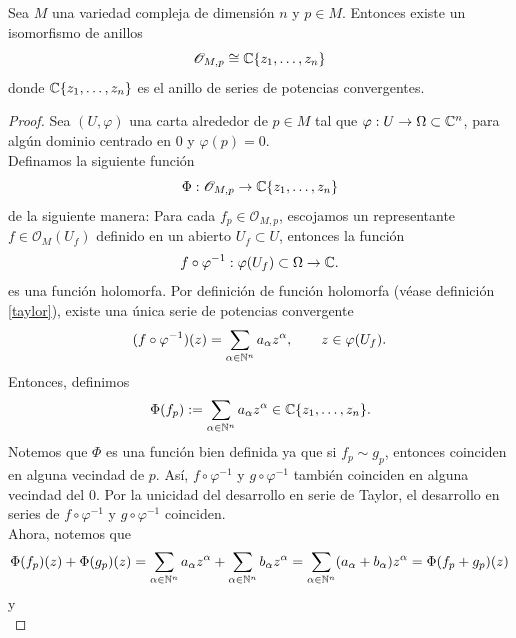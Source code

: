 \fi
\begin{propo}
	Sea $M$ una variedad compleja de dimensión $n$ y $p\in M$. Entonces existe un isomorfismo de anillos
	\begin{equation*}
		\mathscr{O}_{M,p}\cong \mathbb{C}\{z_1,\dots,z_n\}
	\end{equation*}
	donde $\mathbb{C}\{z_1,\dots,z_n\}$ es el anillo de series de potencias convergentes. 
\end{propo}

\begin{proof}
	Sea $(U,\varphi)$ una carta alrededor de $p\in M$ tal que $\varphi:U\to \Omega\subset \mathbb{C}^n$, para algún dominio centrado en $0$ y $\varphi(p)=0$.\\
	Definamos la siguiente función
	\begin{equation*}
		\Phi:\mathscr{O}_{M,p}\to\mathbb{C}\{z_1,\dots,z_n\}
	\end{equation*}
	de la siguiente manera: Para cada $f_p\in \mathscr{O}_{M,p}$, escojamos un representante $f\in\mathscr{O}_M(U_f)$ definido en un abierto $U_f\subset U$, entonces la función
	\begin{equation*}
		f\circ \varphi^{-1}:\varphi(U_f)\subset \Omega\to \mathbb{C}.
	\end{equation*}
	es una función holomorfa. Por definición de función holomorfa (véase definición \ref{taylor}), existe una única serie de potencias convergente 
	\begin{equation*}
		(f\circ \varphi^{-1})(z)=\sum_{\alpha\in\mathbb{N}^n} a_\alpha z^{\alpha},\qquad z\in \varphi(U_f).
	\end{equation*}
	Entonces, definimos
	\begin{equation*}
		\Phi(f_p):=\sum_{\alpha\in\mathbb{N}^n} a_\alpha z^{\alpha}\in\mathbb{C}\{z_1,\dots,z_n\}.
	\end{equation*}
	Notemos que $\Phi$ es una función bien definida ya que si $f_p\sim g_p$, entonces coinciden en alguna vecindad de $p$. Así, $f\circ \varphi^{-1}$ y $g\circ \varphi^{-1}$ también coinciden en alguna vecindad del $0$. Por la unicidad del desarrollo en serie de Taylor, el desarrollo en series de $f\circ \varphi^{-1}$ y $g\circ \varphi^{-1}$ coinciden.\\
	Ahora, notemos que
	\begin{align*}
		\Phi(f_p)(z)+\Phi(g_p)(z)=\sum_{\alpha\in\mathbb{N}^n} a_\alpha z^{\alpha}+\sum_{\alpha\in\mathbb{N}^n} b_\alpha z^{\alpha}=\sum_{\alpha\in\mathbb{N}^n}(a_\alpha+b_\alpha)z^\alpha=\Phi(f_p+g_p)(z)
	\end{align*}
	y
	\begin{equation*}

\end{equation*}
\end{proof}
